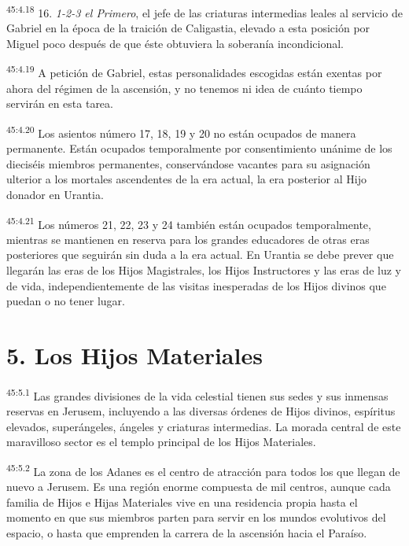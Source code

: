 \par
\textsuperscript{45:4.18} 16. \textit{1-2-3 el Primero}, el jefe de las criaturas intermedias leales al servicio de Gabriel en la época de la traición de Caligastia, elevado a esta posición por Miguel poco después de que éste obtuviera la soberanía incondicional.

\par
\textsuperscript{45:4.19} A petición de Gabriel, estas personalidades escogidas están exentas por ahora del régimen de la ascensión, y no tenemos ni idea de cuánto tiempo servirán en esta tarea.

\par
\textsuperscript{45:4.20} Los asientos número 17, 18, 19 y 20 no están ocupados de manera permanente. Están ocupados temporalmente por consentimiento unánime de los dieciséis miembros permanentes, conservándose vacantes para su asignación ulterior a los mortales ascendentes de la era actual, la era posterior al Hijo donador en Urantia.

\par
\textsuperscript{45:4.21} Los números 21, 22, 23 y 24 también están ocupados temporalmente, mientras se mantienen en reserva para los grandes educadores de otras eras posteriores que seguirán sin duda a la era actual. En Urantia se debe prever que llegarán las eras de los Hijos Magistrales, los Hijos Instructores y las eras de luz y de vida, independientemente de las visitas inesperadas de los Hijos divinos que puedan o no tener lugar.

\section*{5. Los Hijos Materiales}
\par
\textsuperscript{45:5.1} Las grandes divisiones de la vida celestial tienen sus sedes y sus inmensas reservas en Jerusem, incluyendo a las diversas órdenes de Hijos divinos, espíritus elevados, superángeles, ángeles y criaturas intermedias. La morada central de este maravilloso sector es el templo principal de los Hijos Materiales.

\par
\textsuperscript{45:5.2} La zona de los Adanes es el centro de atracción para todos los que llegan de nuevo a Jerusem. Es una región enorme compuesta de mil centros, aunque cada familia de Hijos e Hijas Materiales vive en una residencia propia hasta el momento en que sus miembros parten para servir en los mundos evolutivos del espacio, o hasta que emprenden la carrera de la ascensión hacia el Paraíso.

